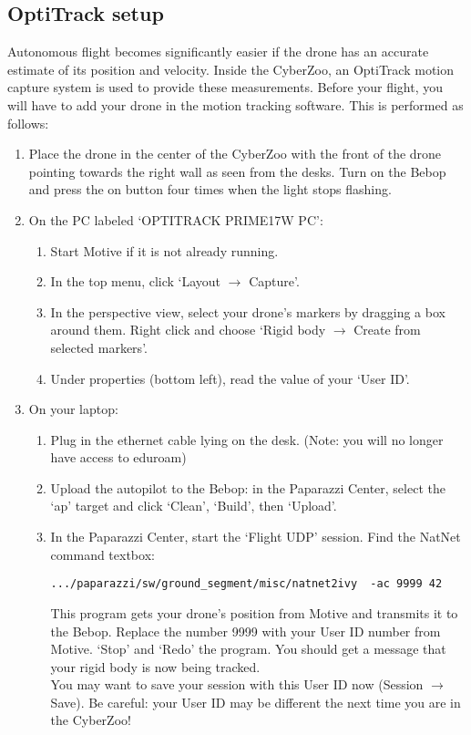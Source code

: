 \documentclass{article}
\begin{document}
\subsection*{OptiTrack setup}
Autonomous flight becomes significantly easier if the drone has an accurate estimate of its position and velocity. Inside the CyberZoo, an OptiTrack motion capture system is used to provide these measurements. Before your flight, you will have to add your drone in the motion tracking software. This is performed as follows:
\begin{enumerate}
\item Place the drone in the center of the CyberZoo with the front of the drone pointing towards the right wall as seen from the desks. Turn on the Bebop and press the on button four times when the light stops flashing. 
\item On the PC labeled `OPTITRACK PRIME17W PC':
\begin{enumerate}
\item Start Motive if it is not already running.
\item In the top menu, click `Layout $\rightarrow$ Capture'.
\item In the perspective view, select your drone's markers by dragging a box around them. Right click and choose `Rigid body $\rightarrow$ Create from selected markers'.
\item Under properties (bottom left), read the value of your `User ID'.
\end{enumerate}
\item On your laptop:
\begin{enumerate}
\item Plug in the ethernet cable lying on the desk. (Note: you will no longer have access to eduroam)
\item Upload the autopilot to the Bebop: in the Paparazzi Center, select the `ap' target and click `Clean', `Build', then `Upload'.
\item In the Paparazzi Center, start the `Flight UDP' session. Find the NatNet command textbox:
\begin{verbatim}
.../paparazzi/sw/ground_segment/misc/natnet2ivy  -ac 9999 42
\end{verbatim}
This program gets your drone's position from Motive and transmits it to the Bebop. Replace the number 9999 with your User ID number from Motive. `Stop' and `Redo' the program. You should get a message that your rigid body is now being tracked.\\
You may want to save your session with this User ID now (Session $\rightarrow$ Save). Be careful: your User ID may be different the next time you are in the CyberZoo!

\end{enumerate}
\end{enumerate}
\end{document}
